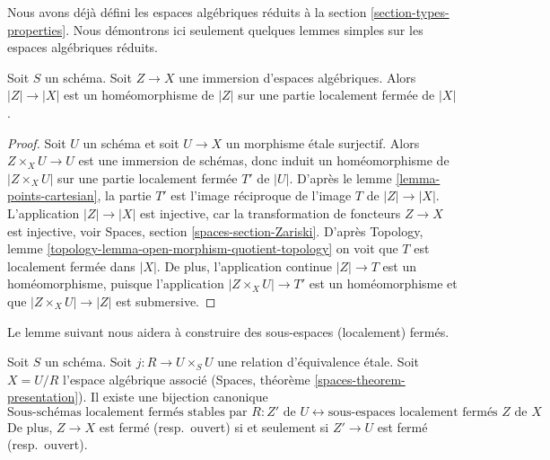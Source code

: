 \noindent
Nous avons déjà défini les espaces algébriques réduits à la
section \ref{section-types-properties}.
Nous démontrons ici seulement quelques lemmes simples sur les espaces
algébriques réduits.

\begin{lemma}
\label{lemma-subspace-induced-topology}
Soit $S$ un schéma. Soit $Z \to X$ une immersion d'espaces algébriques.
Alors $|Z| \to |X|$ est un homéomorphisme de $|Z|$ sur une partie localement fermée
de $|X|$.
\end{lemma}

\begin{proof}
Soit $U$ un schéma et soit $U \to X$ un morphisme \'etale surjectif.
Alors $Z \times_X U \to U$ est une immersion de schémas, donc induit un
homéomorphisme de $|Z \times_X U|$ sur une partie localement fermée $T'$
de $|U|$. D'après le lemme \ref{lemma-points-cartesian}, la partie
$T'$ est l'image réciproque de l'image $T$ de $|Z| \to |X|$.
L'application $|Z| \to |X|$ est injective, car la transformation de
foncteurs $Z \to X$ est injective, voir
Spaces, section \ref{spaces-section-Zariski}. D'après
Topology, lemme \ref{topology-lemma-open-morphism-quotient-topology}
on voit que $T$ est localement fermée dans $|X|$. De plus, l'application continue
$|Z| \to T$ est un homéomorphisme, puisque l'application $|Z \times_X U| \to T'$
est un homéomorphisme et que $|Z \times_X U| \to |Z|$ est submersive.
\end{proof}

\noindent
Le lemme suivant nous aidera à construire des sous-espaces
(localement) fermés.

\begin{lemma}
\label{lemma-subspaces-presentation}
Soit $S$ un schéma. Soit $j : R \to U \times_S U$ une relation d'équivalence \'etale.
Soit $X = U/R$ l'espace algébrique associé
(Spaces, théorème \ref{spaces-theorem-presentation}). Il existe une
bijection canonique
$$
\text{Sous-schémas localement fermés stables par }R : Z'\text{ de }U
\leftrightarrow
\text{sous-espaces localement fermés }Z\text{ de }X
$$
De plus, $Z \to X$ est fermé (resp.\ ouvert) si et seulement si
$Z' \to U$ est fermé (resp.\ ouvert).
\end{lemma}

